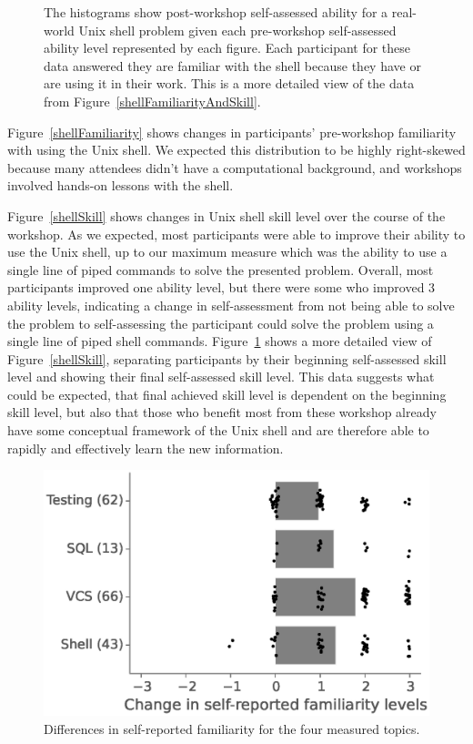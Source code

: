 \documentclass[10pt, twocolumn]{article}
\begin{document}
\begin{figure}[t]
\begin{subfigure}[c]{2.1in}
    \end{subfigure}
\caption{
  The histograms show post-workshop self-assessed ability for a real-world Unix shell problem
  given each pre-workshop self-assessed ability level represented by each figure.
  Each participant for these data answered they are familiar with the shell because they have or are using it in their work.
  This is a more detailed view of the data from Figure~\ref{shellFamiliarityAndSkill}.
\label{shellDetailSkill}}

\end{figure}

Figure~\ref{shellFamiliarity} shows changes in participants' pre-workshop familiarity with using the Unix shell.
We expected this distribution to be highly right-skewed because
many attendees didn't have a computational background,
and workshops involved hands-on lessons with the shell.

Figure~\ref{shellSkill} shows changes in Unix shell skill level over the course of the workshop.
As we expected, most participants were able to improve their ability to use the Unix shell,
up to our maximum measure
which was the ability to use a single line of piped commands to solve the presented problem.
Overall, most participants improved one ability level,
but there were some who improved 3 ability levels,
indicating a change in self-assessment from not being able to solve the problem
to self-assessing the participant could solve the problem using a single line of piped shell commands.
Figure~\ref{shellDetailSkill} shows a more detailed view of Figure~\ref{shellSkill},
separating participants by their beginning self-assessed skill level
and showing their final self-assessed skill level.
This data suggests what could be expected, 
that final achieved skill level is dependent on the beginning skill level,
but also that those who benefit most from these workshop
already have some conceptual framework of the Unix shell
and are therefore able to rapidly and effectively learn
the new information.

\begin{figure}
\centering
\includegraphics[width=\linewidth]{AvgFamiliarityEffect}
\caption{
    Differences in self-reported familiarity for the four measured topics.
\label{AvgFamiliarityEffect}}

\end{figure}
\end{document}
